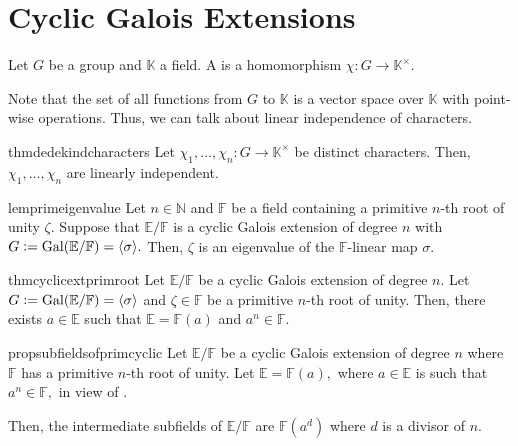 \section{Cyclic Galois Extensions}
\begin{defn}%
	Let $G$ be a group and $\mathbb{K}$ a field. A  is a homomorphism $\chi : G \to \mathbb{K}^\times.$
\end{defn}

\begin{rem}
	Note that the set of all functions from $G$ to $\mathbb{K}$ is a vector space over $\mathbb{K}$ with point-wise operations. Thus, we can talk about linear independence of characters.
\end{rem}

\begin{restatable}[Dedekind]{thm}{dedekindcharacters}
\label{thm:dedekindcharacters}
	Let $\chi_1, \ldots, \chi_n : G \to \mathbb{K}^\times$ be distinct characters. Then, $\chi_1, \ldots, \chi_n$ are linearly independent. \hfill\hyperref[thm:dedekindcharacters2]{\downsym}
\end{restatable}

\begin{restatable}[]{lem}{primeigenvalue}
\label{lem:primeigenvalue}
	Let $n \in \mathbb{N}$ and $\mathbb{F}$ be a field containing a primitive $n$-th root of unity $\zeta.$ Suppose that $\mathbb{E}/\mathbb{F}$ is a cyclic Galois extension of degree $n$ with $G \vcentcolon= \operatorname{Gal}(\mathbb{E}/\mathbb{F}) = \langle \sigma\rangle.$ Then, $\zeta$ is an eigenvalue of the $\mathbb{F}$-linear map $\sigma.$ \hfill\hyperref[lem:primeigenvalue2]{\downsym}
\end{restatable}

\begin{restatable}[]{thm}{cyclicextprimroot}
\label{thm:cyclicextprimroot}
	Let $\mathbb{E}/\mathbb{F}$ be a cyclic Galois extension of degree $n.$ Let $G \vcentcolon= \operatorname{Gal}(\mathbb{E}/\mathbb{F}) = \langle \sigma\rangle$ and $\zeta \in \mathbb{F}$ be a primitive $n$-th root of unity. Then, there exists $a \in \mathbb{E}$ such that $\mathbb{E} = \mathbb{F}(a)$ and $a^n \in \mathbb{F}.$ \hfill\hyperref[thm:cyclicextprimroot2]{\downsym}
\end{restatable}

\begin{restatable}[]{prop}{subfieldsofprimcyclic}
\label{prop:subfieldsofprimcyclic}
	Let $\mathbb{E}/\mathbb{F}$ be a cyclic Galois extension of degree $n$ where $\mathbb{F}$ has a primitive $n$-th root of unity. Let $\mathbb{E} = \mathbb{F}(a),$ where $a \in \mathbb{E}$ is such that $a^n \in \mathbb{F},$ in view of .

	Then, the intermediate subfields of $\mathbb{E}/\mathbb{F}$ are $\mathbb{F}(a^d)$ where $d$ is a divisor of $n.$ \hfill\hyperref[prop:subfieldsofprimcyclic2]{\downsym}
\end{restatable}

